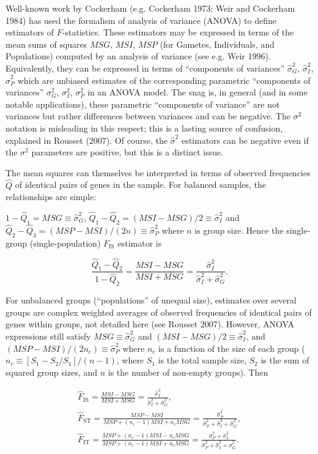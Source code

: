 \documentclass[12pt,]{book}
\theoremstyle{definition}
\theoremstyle{definition}
\theoremstyle{definition}
\theoremstyle{remark}
\begin{document}
Well-known work by Cockerham (e.g. Cockerham 1973; Weir and Cockerham
1984) has used the formalism of analysis of variance (ANOVA) to define
estimators of \(F\)-statistics. These estimators may be expressed in
terms of the mean sums of squares \(MSG\), \(MSI\), \(MSP\) (for
Gametes, Individuals, and Populations) computed by an analysis of
variance (see e.g. Weir 1996). Equivalently, they can be expressed in
terms of ``components of variances'' \(\hat{\sigma}^2_G\),
\(\hat{\sigma}^2_I\), \(\hat{\sigma}^2_P\) which are unbiased estimates
of the corresponding parametric ``components of variances''
\(\sigma^2_G\), \(\sigma^2_I\), \(\sigma^2_P\) in an ANOVA model. The
snag is, in general (and in some notable applications), these parametric
``components of variance'' are not variances but rather differences
between variances and can be negative. The \(\sigma^2\) notation is
misleading in this respect; this is a lasting source of confusion,
explained in Rousset (2007). Of course, the \(\hat{\sigma}^2\)
estimators can be negative even if the \(\sigma^2\) parameters are
positive, but this is a distinct issue.

The mean squares can themselves be interpreted in terms of observed
frequencies \(\hat{Q}\) of identical pairs of genes in the sample. For
balanced samples, the relationships are simple:

\(1-\hat{Q}_1=MSG\equiv \hat{\sigma}^2_G\),
\(\hat{Q}_1-\hat{Q}_2=(MSI-MSG)/2\equiv \hat{\sigma}^2_I\) and
\(\hat{Q}_2-\hat{Q}_3=(MSP-MSI)/(2n)\equiv \hat{\sigma}^2_P\) where
\(n\) is group size. Hence the single-group (single-population)
\(F_\mathrm{IS}\) estimator is

\[\label{}
    \frac{\hat{Q}_1-\hat{Q}_2}{1-\hat{Q}_2}=
    \frac{MSI-MSG}{MSI+MSG}=
    \frac{\hat{\sigma}^2_I}{\hat{\sigma}^2_I+\hat{\sigma}^2_G}.\]

For unbalanced groups (``populations'' of unequal size), estimates over
several groups are complex weighted averages of observed frequencies of
identical pairs of genes within groups, not detailed here (see Rousset
2007). However, ANOVA expressions still satisfy
\(MSG\equiv \hat{\sigma}^2_G\) and
\((MSI-MSG)/2\equiv \hat{\sigma}^2_I\), and
\((MSP-MSI)/(2n_c)\equiv \hat{\sigma}^2_P\) where \(n_c\) is a function
of the size of each group (\(n_c\equiv [S_1-S_2/S_1]/(n-1)\), where
\(S_1\) is the total sample size, \(S_2\) is the sum of squared group
sizes, and \(n\) is the number of non-empty groups). Then

\[\begin{gathered}
    \hat{F}_{\mathrm{IS}}=    \frac{MSI-MSG}{MSI+MSG}=
    \frac{\hat{\sigma}^2_I}{\hat{\sigma}^2_I+\hat{\sigma}^2_G}, \\
        \hat{F}_{\mathrm{ST}}=    \frac{MSP-MSI}{MSP+(n_c-1)MSI+n_cMSG}=
    \frac{\hat{\sigma}^2_P}{\hat{\sigma}^2_P+\hat{\sigma}^2_I+\hat{\sigma}^2_G}, \\
        \hat{F}_{\mathrm{IT}}=    \frac{MSP+(n_c-1)MSI-n_cMSG}{MSP+(n_c-1)MSI+n_cMSG}=
    \frac{\hat{\sigma}^2_P+\hat{\sigma}^2_I}{\hat{\sigma}^2_P+\hat{\sigma}^2_I+\hat{\sigma}^2_G}.\end{gathered}\]
\end{document}
